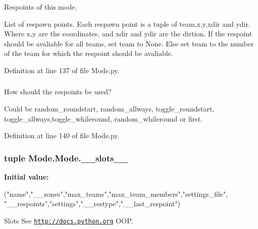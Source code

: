 Respoints of this mode. 

List of respawn points. Each respawn point is a tuple of team,x,y,xdir and ydir. Where x,y are the coordinates, and xdir and ydir are the dirtion. If the respoint should be avaliable for all teams, set team to None. Else set team to the number of the team for which the respoint should be avaliable. 

Definition at line 137 of file Mode.py.

\hypertarget{class_mode_1_1_mode_a1fd32aea9872573e444d08b65ec28ef2}{
\subsubsection[{\_\-\_\-restype}]{}}
\label{class_mode_1_1_mode_a1fd32aea9872573e444d08b65ec28ef2}


How should the respoints be used? 

Could be random\_\-roundstart, random\_\-allways, toggle\_\-roundstart, toggle\_\-allways,toggle\_\-whileround, random\_\-whileround or first. 

Definition at line 140 of file Mode.py.

\hypertarget{class_mode_1_1_mode_a6f65d9a9362971bd8896a81a0d71c642}{
\subsubsection[{\_\-\_\-slots\_\-\_\-}]{\setlength{\rightskip}{0pt plus 5cm}tuple {\bf Mode.Mode.\_\-\_\-slots\_\-\_\-}}}
\label{class_mode_1_1_mode_a6f65d9a9362971bd8896a81a0d71c642}
{\bfseries Initial value:}
\begin{DoxyCode}
("name","__zones","max_teams","max_team_members","settings_file",
                   "__respoints","settings","__restype","__last_respoint")
\end{DoxyCode}


Slots  See \href{http://docs.python.org}{\tt http://docs.python.org} OOP. 



